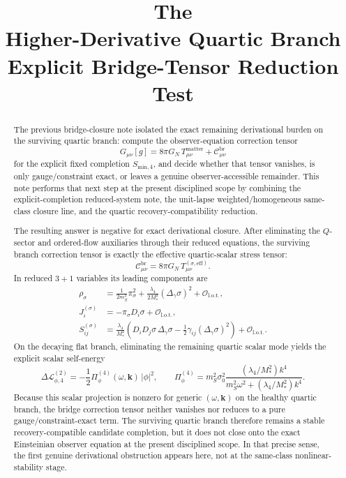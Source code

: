 \documentclass[11pt]{article}
\title{\textbf{The \TheoryName{}}\\[0.4em]
\large Higher-Derivative Quartic Branch Explicit Bridge-Tensor Reduction Test}
\author{}
\date{}
\begin{document}
\maketitle

\begin{abstract}
The previous bridge-closure note isolated the exact remaining derivational burden on the surviving quartic branch: compute the observer-equation correction tensor
\[
G_{\mu\nu}[g]
=
8\pi G_N\,T_{\mu\nu}^{\mathrm{matter}}
+ \mathcal C_{\mu\nu}^{\mathrm{br}}
\]
for the explicit fixed completion \(S_{\mathrm{min},4}\), and decide whether that tensor vanishes, is only gauge/constraint exact, or leaves a genuine observer-accessible remainder. This note performs that next step at the present disciplined scope by combining the explicit-completion reduced-system note, the unit-lapse weighted/homogeneous same-class closure line, and the quartic recovery-compatibility reduction.

The resulting answer is negative for exact derivational closure. After eliminating the \(Q\)-sector and ordered-flow auxiliaries through their reduced equations, the surviving branch correction tensor is exactly the effective quartic-scalar stress tensor:
\[
\mathcal C_{\mu\nu}^{\mathrm{br}}
=
8\pi G_N\,T_{\mu\nu}^{(\sigma,\mathrm{eff})}.
\]
In reduced \(3+1\) variables its leading components are
\begin{align*}
\rho_\sigma
&=
\frac{1}{2m_S^2}\pi_\sigma^2
+ \frac{\lambda_4}{2M_*^2}(\Delta_\gamma\sigma)^2
+ \mathcal O_{\mathrm{l.o.t.}},
\\
J_i^{(\sigma)}
&=
-\pi_\sigma D_i\sigma
+ \mathcal O_{\mathrm{l.o.t.}},
\\
S_{ij}^{(\sigma)}
&=
\frac{\lambda_4}{M_*^2}
\left(
D_iD_j\sigma\,\Delta_\gamma\sigma
-\frac{1}{2}\gamma_{ij}(\Delta_\gamma\sigma)^2
\right)
+ \mathcal O_{\mathrm{l.o.t.}}.
\end{align*}
On the decaying flat branch, eliminating the remaining quartic scalar mode yields the explicit scalar self-energy
\[
\Delta\mathcal L_{\phi,4}^{(2)}
=
-\frac{1}{2}\Pi_\phi^{(4)}(\omega,\mathbf{k})\,|\phi|^2,
\qquad
\Pi_\phi^{(4)}
=
m_S^2\sigma_0^2
\frac{(\lambda_4/M_*^2)k^4}
{m_S^2\omega^2+(\lambda_4/M_*^2)k^4}.
\]
Because this scalar projection is nonzero for generic \((\omega,\mathbf{k})\) on the healthy quartic branch, the bridge correction tensor neither vanishes nor reduces to a pure gauge/constraint-exact term. The surviving quartic branch therefore remains a stable recovery-compatible candidate completion, but it does not close onto the exact Einsteinian observer equation at the present disciplined scope. In that precise sense, the first genuine derivational obstruction appears here, not at the same-class nonlinear-stability stage.
\end{abstract}
\end{document}
